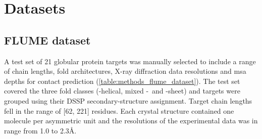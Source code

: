 
\section{Datasets}
\subsection{FLUME dataset}
A test set of 21 globular protein targets was manually selected to include a range of chain lengths, fold architectures, X-ray diffraction data resolutions and \gls{msa} depths for contact prediction  (\cref{table:methods_flume_dataset}). The test set covered the three fold classes (\textalpha-helical, mixed \textalpha-\textbeta\ and \textbeta-sheet) and targets were grouped using their DSSP \cite{Kabsch1983-dy} secondary-structure assignment. Target chain lengths fell in the range of [62, 221] residues. Each crystal structure contained one molecule per asymmetric unit and the resolutions of the experimental data was in range from 1.0 to 2.3\AA.

